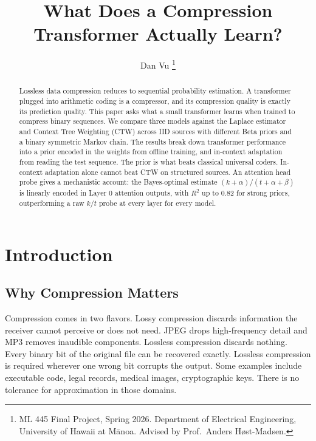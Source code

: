 \documentclass[onecolumn,english,12pt]{IEEEtran}
\begin{document}
\title{What Does a Compression Transformer Actually Learn?}

\author{Dan Vu%
  \thanks{ML 445 Final Project, Spring 2026. Department of Electrical Engineering, University of Hawaii at M\={a}noa. Advised by Prof.\ Anders H\o{}st-Madsen.}}

\maketitle

\begin{abstract}
Lossless data compression reduces to sequential probability estimation.
A transformer plugged into arithmetic coding is a compressor, and its compression quality is exactly its prediction quality.
This paper asks what a small transformer learns when trained to compress binary sequences.
We compare three models against the Laplace estimator and Context Tree Weighting (CTW) across IID sources with different Beta priors and a binary symmetric Markov chain.
The results break down transformer performance into a prior encoded in the weights from offline training, and in-context adaptation from reading the test sequence.
The prior is what beats classical universal coders.
In-context adaptation alone cannot beat CTW on structured sources.
An attention head probe gives a mechanistic account: the Bayes-optimal estimate $(k+\alpha)/(t+\alpha+\beta)$ is linearly encoded in Layer 0 attention outputs, with $R^2$ up to 0.82 for strong priors, outperforming a raw $k/t$ probe at every layer for every model.
\end{abstract}

\section{Introduction}
\label{sec:intro}

\subsection{Why Compression Matters}
\label{sec:why}

Compression comes in two flavors. Lossy compression discards information
the receiver cannot perceive or does not need. JPEG drops high-frequency
detail and MP3 removes inaudible components. Lossless compression discards
nothing. Every binary bit of the original file can be recovered exactly. Lossless compression
is required wherever one wrong bit corrupts the output. Some examples include executable code,
legal records, medical images, cryptographic keys. There is no tolerance
for approximation in those domains.
\end{document}

